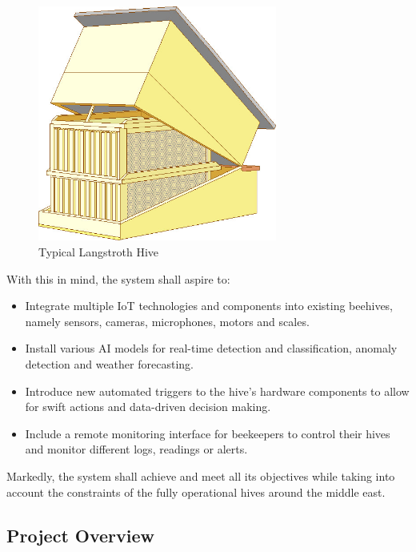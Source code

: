 \documentclass[12pt]{article}
\begin{document}
	\begin{figure}[H]
		\centering
		\includegraphics[width=0.7\textwidth]{Images/hive.jpg}
		\caption{Typical Langstroth Hive \cite{CushmanBeeLang}}
		\label{fig:LANGSTROTH_HIVE}
		\vspace{1.5 cm}
	\end{figure}
	
	\hspace{-0.5 cm}With this in mind, the system shall aspire to:
	\begin{itemize}
		\item Integrate multiple IoT technologies and components into existing beehives, namely sensors, cameras, microphones, motors and scales.
		
		\item Install various AI models for real-time detection and classification, anomaly detection and weather forecasting.
		
		\item Introduce new automated triggers to the hive’s hardware components to allow for swift actions and data-driven decision making.
		
		\item Include a remote monitoring interface for beekeepers to control their hives and monitor different logs, readings or alerts.
	\end{itemize} 
	Markedly, the system shall achieve and meet all its objectives while taking into account the constraints of the fully operational hives around the middle east.
	\newpage
	\subsection{Project Overview}
	
\end{document}
